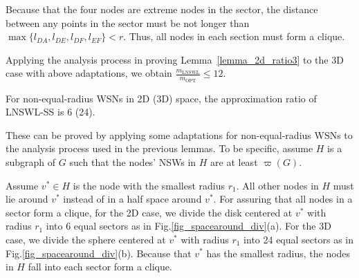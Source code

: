 \documentclass[12pt,journal,onecolumn,draftcls]{IEEEtran}
\begin{document}
\begin{IEEEproof}
Because that the four nodes are extreme nodes in the sector, the distance between any points in the sector must be not longer than $\max\{l_{DA},l_{DE},l_{DF},l_{EF}\}{<}r$. Thus, all nodes in each section must form a clique.

Applying the analysis process in proving Lemma~\ref{lemma_2d_ratio3} to the 3D case with above adaptations, we obtain $\frac{m_\text{LNSWL}}{m_\text{OPT}}{\leq}12$.
\end{IEEEproof}

\begin{lemma}
\label{lemma_2d3d_ratio}
For non-equal-radius WSNs in 2D (3D) space, the approximation ratio of LNSWL-SS is 6 (24).
\end{lemma}

\begin{IEEEproof}
These can be proved by applying some adaptations for non-equal-radius WSNs to the analysis process used in the previous lemmas. To be specific, assume $H$ is a subgraph of $G$ such that the nodes' NSWs in $H$ are at least $\varpi(G)$.

Assume $v^{*}{\in}H$ is the node with the smallest radius $r_1$. All other nodes in $H$ must lie around $v^{*}$ instead of in a half space around $v^{*}$. For assuring that all nodes in a sector form a clique, for the 2D case, we divide the disk centered at $v^{*}$ with radius $r_1$ into 6 equal sectors as in Fig.\ref{fig_spacearound_div}(a). For the 3D case, we divide the sphere centered at $v^{*}$ with radius $r_1$ into 24 equal sectors as in Fig.\ref{fig_spacearound_div}(b). Because that $v^{*}$ has the smallest radius, the nodes in $H$ fall into each sector form a clique.


\end{IEEEproof}
\end{document}
